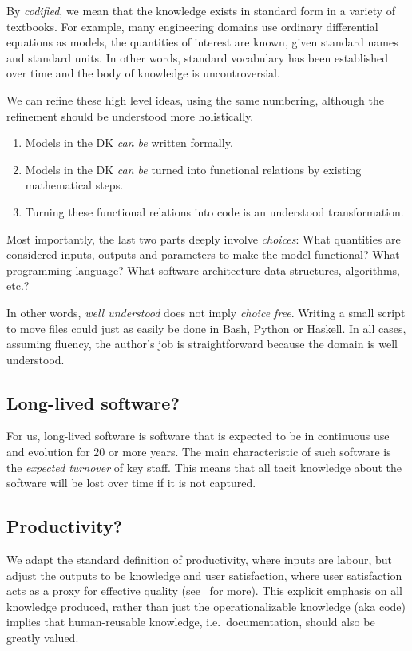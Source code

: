 \documentclass[sigconf,review]{acmart}
\begin{document}
By \emph{codified}, we mean that the knowledge exists in standard form in a
variety of textbooks. For example, many engineering domains use
ordinary differential equations as models, the quantities of
interest are known, given standard names and standard units. In other words,
standard vocabulary has been established over time and the body of knowledge is
uncontroversial.

We can refine these high level ideas, using the same numbering,
although the refinement should be
understood more holistically.
\begin{enumerate}
\item Models in the DK \emph{can be} written formally.
\item Models in the DK \emph{can be} turned into functional relations by
 existing mathematical steps.
\item Turning these functional relations into code is an understood
 transformation.
\end{enumerate}
Most importantly, the last two parts
deeply involve \emph{choices}: What quantities are considered inputs, outputs
and parameters to make the model functional? What programming language?  What
software architecture data-structures, algorithms, etc.?

In other words,
\emph{well understood} does not imply \emph{choice free}.  Writing a small 
script to move files could just as easily be done in Bash, Python or Haskell.
In all cases, assuming fluency, the author's job is straightforward because
the domain is well understood.

\subsection{Long-lived software?}
For us, long-lived software is software that is expected to be in continuous
use and evolution for $20$ or more years. The main characteristic of
such software is the \emph{expected turnover} of key staff. This means that
all tacit knowledge about the software will be lost over time if it is not
captured.

\subsection{Productivity?}
We adapt the standard definition of productivity, where inputs are labour,
but adjust the outputs to be knowledge and user satisfaction, where user
satisfaction acts as a proxy for effective quality
(see~\cite{SmithAndCarette2020arXiv} for more).
This explicit emphasis on all knowledge produced, rather than just the
operationalizable knowledge (aka code)
implies that human-reusable knowledge, i.e.\ documentation, should also be
greatly valued.
\end{document}
